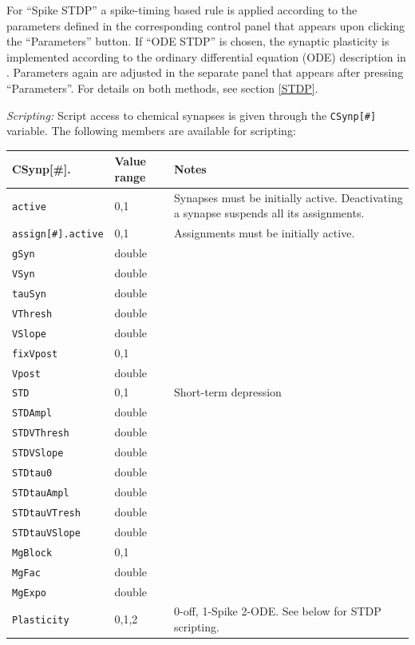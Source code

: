 \documentclass{article}
\begin{document}
%
For ``Spike STDP'' a spike-timing based
  rule is applied according to the parameters defined in the
  corresponding control panel that appears upon clicking the
  ``Parameters'' button.
  If ``ODE STDP'' is chosen, the synaptic
  plasticity is implemented according to the ordinary differential
  equation (ODE) description in \cite{Abarbanel2002}. Parameters again
  are adjusted in the separate panel that appears after pressing
  ``Parameters''. For details on both methods, see section \ref{STDP}.

\noindent
\emph{Scripting:} Script access to chemical synapses is given through the \texttt{CSynp[\#]} variable.
The following members are available for scripting: \\
\begin{tabularx}{\linewidth}{|ll|X|}
	\hline
	{\bf CSynp[\#].\textvisiblespace} & {\bf Value range} & {\bf Notes} \\
	\hline
	\texttt{active} & 0,1 & Synapses must be initially active. Deactivating a synapse suspends all
	its assignments. \\
	\texttt{assign[\#].active} & 0,1 & Assignments must be initially active. \\
	\texttt{gSyn} & double & \\
	\texttt{VSyn} & double & \\
	\texttt{tauSyn} & double & \\
	\texttt{VThresh} & double & \\
	\texttt{VSlope} & double & \\
	\texttt{fixVpost} & 0,1 & \\
	\texttt{Vpost} & double & \\
	\texttt{STD} & 0,1 & Short-term depression \\
	\texttt{STDAmpl} & double & \\
	\texttt{STDVThresh} & double & \\
	\texttt{STDVSlope} & double & \\
	\texttt{STDtau0} & double & \\
	\texttt{STDtauAmpl} & double & \\
	\texttt{STDtauVTresh} & double & \\
	\texttt{STDtauVSlope} & double & \\
	\texttt{MgBlock} & 0,1 & \\
	\texttt{MgFac} & double & \\
	\texttt{MgExpo} & double & \\
	\texttt{Plasticity} & 0,1,2 & 0-off, 1-Spike 2-ODE. See below for STDP scripting.\\
	\hline
\end{tabularx}
\end{document}

